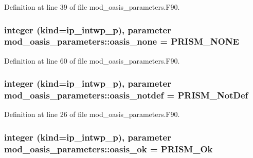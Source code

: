 Definition at line 39 of file mod\+\_\+oasis\+\_\+parameters.\+F90.

\hypertarget{classmod__oasis__parameters_a368402af56fd08ed95ad88d0c987733a}{
\subsubsection[{oasis\+\_\+none}]{\setlength{\rightskip}{0pt plus 5cm}integer (kind=ip\+\_\+intwp\+\_\+p), parameter mod\+\_\+oasis\+\_\+parameters\+::oasis\+\_\+none = P\+R\+I\+S\+M\+\_\+\+N\+O\+N\+E}}\label{classmod__oasis__parameters_a368402af56fd08ed95ad88d0c987733a}


Definition at line 60 of file mod\+\_\+oasis\+\_\+parameters.\+F90.

\hypertarget{classmod__oasis__parameters_acbe396fd3b5e7b00dd66425f0acb546d}{
\subsubsection[{oasis\+\_\+notdef}]{\setlength{\rightskip}{0pt plus 5cm}integer (kind=ip\+\_\+intwp\+\_\+p), parameter mod\+\_\+oasis\+\_\+parameters\+::oasis\+\_\+notdef = P\+R\+I\+S\+M\+\_\+\+Not\+Def}}\label{classmod__oasis__parameters_acbe396fd3b5e7b00dd66425f0acb546d}


Definition at line 26 of file mod\+\_\+oasis\+\_\+parameters.\+F90.

\hypertarget{classmod__oasis__parameters_a3ea125963822918ce37fd3cfd9658c9f}{
\subsubsection[{oasis\+\_\+ok}]{\setlength{\rightskip}{0pt plus 5cm}integer (kind=ip\+\_\+intwp\+\_\+p), parameter mod\+\_\+oasis\+\_\+parameters\+::oasis\+\_\+ok = P\+R\+I\+S\+M\+\_\+\+Ok}}\label{classmod__oasis__parameters_a3ea125963822918ce37fd3cfd9658c9f}


